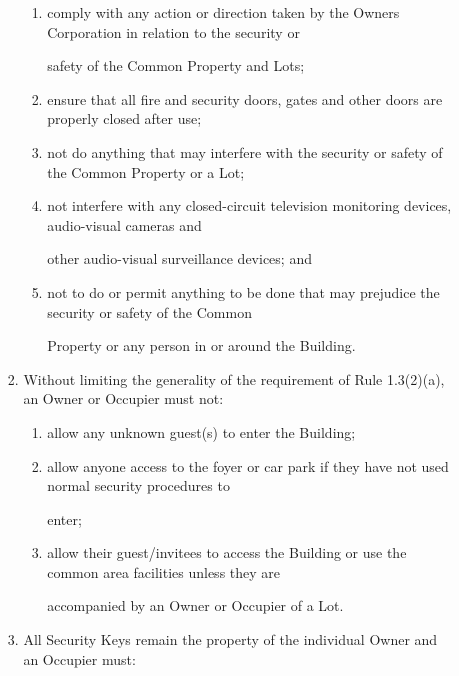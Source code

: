 \documentclass{article}
\begin{document}
\begin{enumerate}[label=\arabic*.]
\begin{enumerate}[label=\arabic{enumi}.\arabic*.]
\begin{enumerate}[label=(\arabic*)]
\begin{enumerate}[label=(\alph*)]
\item {\fontsize{9.962}{1} comply with any action or direction taken by the Owners Corporation in relation to the security or }

{\fontsize{10.02}{1}safety of the Common Property and Lots; }

\item {\fontsize{9.962}{1} ensure that all fire and security doors, gates and other doors are properly closed after use; }

\item {\fontsize{9.962}{1} not do anything that may interfere with the security or safety of the Common Property or a Lot; }

\item {\fontsize{9.962}{1} not interfere with any closed-circuit television monitoring devices, audio-visual cameras and }

{\fontsize{10.02}{1}other audio-visual surveillance devices; and }

\item {\fontsize{9.962}{1} not to do or permit anything to be done that may prejudice the security or safety of the Common }

{\fontsize{10.02}{1}Property or any person in or around the Building. }

\end{enumerate}
\item {\fontsize{9.962}{1} Without limiting the generality of the requirement of Rule 1.3(2)(a), an Owner or Occupier must not: }

\begin{enumerate}[label=(\alph*)]
\item {\fontsize{9.962}{1} allow any unknown guest(s) to enter the Building; }

\item {\fontsize{9.962}{1} allow anyone access to the foyer or car park if they have not used normal security procedures to }

{\fontsize{10.02}{1}enter; }

\item {\fontsize{9.962}{1} allow their guest/invitees to access the Building or use the common area facilities unless they are }

{\fontsize{10.02}{1}accompanied by an Owner or Occupier of a Lot. }

\end{enumerate}
\item {\fontsize{9.962}{1} All Security Keys remain the property of the individual Owner and an Occupier must: }


\end{enumerate}
\end{enumerate}
\end{enumerate}
\end{document}
